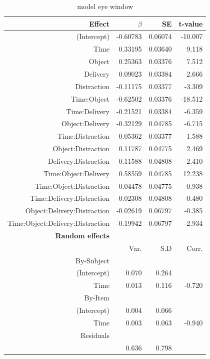 \documentclass[man]{apa6}
\begin{document}
\begin{table}
\begin{tabular}{rrrr}
\hline
Effect & $\beta$ & SE & t-value\\
\hline
(Intercept) & -0.60783 & 0.06074 & -10.007\\
Time & 0.33195 & 0.03640 & 9.118\\
Object & 0.25363 & 0.03376 & 7.512\\
Delivery & 0.09023 & 0.03384 & 2.666\\
Distraction & -0.11175 & 0.03377 & -3.309\\
Time:Object & -0.62502 & 0.03376 & -18.512\\
Time:Delivery & -0.21521 & 0.03384 & -6.359\\
Object:Delivery & -0.32129 & 0.04785 & -6.715\\
Time:Distraction & 0.05362 & 0.03377 & 1.588\\
Object:Distraction & 0.11787 & 0.04775 & 2.469\\
Delivery:Distraction & 0.11588 & 0.04808 & 2.410\\
Time:Object:Delivery & 0.58559 & 0.04785 & 12.238\\
Time:Object:Distraction & -0.04478 & 0.04775 & -0.938\\
Time:Delivery:Distraction & -0.02308 & 0.04808 & -0.480\\
Object:Delivery:Distraction & -0.02619 & 0.06797 & -0.385\\
Time:Object:Delivery:Distraction & -0.19942 & 0.06797 & -2.934\\
\hline
\textbf{Random effects} & & & \\
& Var. & S.D & Corr. \\
By-Subject & & &\\
(Intercept) & 0.070 & 0.264 &\\
Time & 0.013 & 0.116 & -0.720 \\
By-Item & & &\\
(Intercept) & 0.004 & 0.066 &\\
Time & 0.003 & 0.063 & -0.940 \\
Residuals & & & \\
& 0.636 & 0.798 & \\
\hline
\end{tabular}
\caption{model eye window}
\label{table:modeleye}
\end{table}
\end{document}
